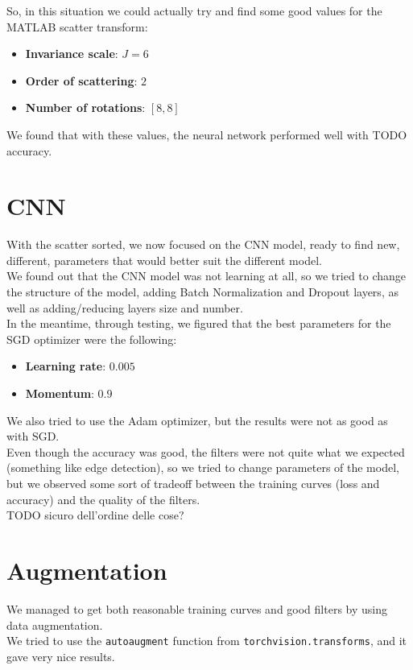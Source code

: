 \documentclass{report}
\begin{document}
So, in this situation we could actually try and find some good values for the MATLAB scatter transform:
\begin{itemize}
  \item \textbf{Invariance scale}: $J=6$
  \item \textbf{Order of scattering}: $2$
  \item \textbf{Number of rotations}: $[8, 8]$
\end{itemize}
We found that with these values, the neural network performed well with TODO accuracy.\\

\section{CNN}
With the scatter sorted, we now focused on the CNN model, ready to find new, different, parameters that would better suit the different model.\\
We found out that the CNN model was not learning at all, so we tried to change the structure of the model, adding Batch Normalization and Dropout layers,
as well as adding/reducing layers size and number.\\
In the meantime, through testing, we figured that the best parameters for the SGD optimizer were the following:
\begin{itemize}
  \item \textbf{Learning rate}: $0.005$ 
  \item \textbf{Momentum}: $0.9$
\end{itemize}
We also tried to use the Adam optimizer, but the results were not as good as with SGD.\\

Even though the accuracy was good, the filters were not quite what we expected (something like edge detection), so we tried to change parameters
of the model, but we observed some sort of tradeoff between the training curves (loss and accuracy) and the quality of the filters.\\
TODO sicuro dell'ordine delle cose?

\section{Augmentation}
We managed to get both reasonable training curves and good filters by using data augmentation.\\
We tried to use the \texttt{autoaugment} function from \texttt{torchvision.transforms}, and it gave very nice results.\\
\end{document}
